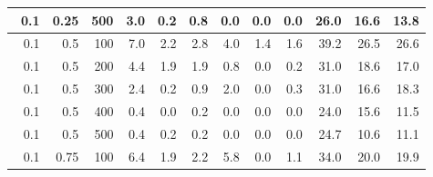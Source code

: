 \begin{longtable}{|r|r|r|r|r|r|r|r|r|r|r|r|}
        \hline \
        0.1                            & 0.25                     & 500                       & 3.0                       & 0.2                       & 0.8                       & 0.0                       & 0.0                       & 0.0                       & 26.0                      & 16.6                      & 13.8                      \\
        \hline \
        0.1                            & 0.5                     & 100                       & 7.0                       & 2.2                       & 2.8                       & 4.0                       & 1.4                       & 1.6                       & 39.2                      & 26.5                      & 26.6                      \\
        \hline \
        0.1                            & 0.5                     & 200                       & 4.4                       & 1.9                       & 1.9                       & 0.8                       & 0.0                       & 0.2                       & 31.0                      & 18.6                      & 17.0                      \\
        \hline \
        0.1                            & 0.5                     & 300                       & 2.4                       & 0.2                       & 0.9                       & 2.0                       & 0.0                       & 0.3                       & 31.0                      & 16.6                      & 18.3                      \\
        \hline \
        0.1                            & 0.5                    & 400                       & 0.4                       & 0.0                       & 0.2                       & 0.0                       & 0.0                       & 0.0                       & 24.0                      & 15.6                      & 11.5                      \\
        \hline \
        0.1                            & 0.5                    & 500                       & 0.4                       & 0.2                       & 0.2                       & 0.0                       & 0.0                       & 0.0                       & 24.7                      & 10.6                      & 11.1                      \\
        \hline \
        0.1                            & 0.75                    & 100                       & 6.4                       & 1.9                       & 2.2                       & 5.8                       & 0.0                       & 1.1                       & 34.0                      & 20.0                      & 19.9                      \\

\end{longtable}
